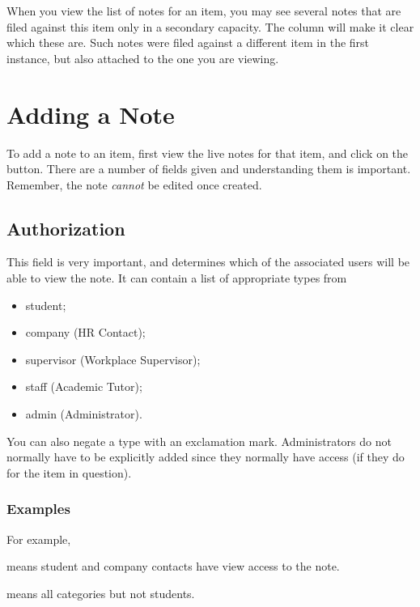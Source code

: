 \documentclass[12 pt]{book}
\begin{document}
When you view the list of notes for an item, you may see several notes that
are filed against this item only in a secondary capacity. The 
column will make it clear which these are. Such notes were filed against a
different item in the first instance, but also attached to the one you are
viewing.

\section{Adding a Note}

To add a note to an item, first view the live notes for that item, and click on
the  button. There are a number of fields given and understanding
them is important. Remember, the note \emph{cannot} be edited once created.

\subsection{Authorization}

This field is very important, and determines which of the associated users will
be able to view the note. It can contain a list of appropriate types from

\begin{itemize}
\item student;
\item company (HR Contact);
\item supervisor (Workplace Supervisor);
\item staff (Academic Tutor);
\item admin (Administrator).
\end{itemize}

You can also negate a type with an exclamation mark. Administrators do not
normally have to be explicitly added since they normally have access (if they
do for the item in question).

\subsubsection{Examples}

For example,


means student and company contacts have view access to the note.


means all categories but not students.

\end{document}
